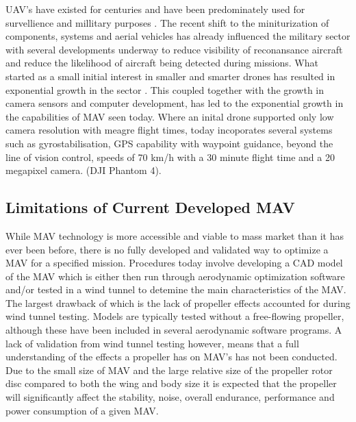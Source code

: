 UAV's have existed for centuries and have been predominately used for survellience and millitary purposes . The recent shift to the miniturization of components, systems and aerial vehicles has already influenced the military sector with several developments underway to reduce visibility of reconansance aircraft and reduce the likelihood of aircraft being detected during missions. What started as a small initial interest in smaller and smarter drones has resulted in exponential growth in the sector . This coupled together with the growth in camera sensors and computer development, has led to the exponential growth in the capabilities of MAV seen today. Where an inital drone supported only low camera resolution with meagre flight times, today incoporates several systems such as gyrostabilisation, GPS capability with waypoint guidance, beyond the line of vision control, speeds of 70 km/h with a 30 minute flight time and a 20 megapixel camera. (DJI Phantom 4). \\


\subsection{Limitations of Current Developed MAV}
\label{subsec:Limitations}
While MAV technology is more accessible and viable to mass market than it has ever been before, there is no fully developed and validated way to optimize a MAV for a specified mission. Procedures today involve developing a CAD model of the MAV which is either then run through aerodynamic optimization software and/or tested in a wind tunnel to detemine the main characteristics of the MAV. The largest drawback of which is the lack of propeller effects accounted for during wind tunnel testing. Models are typically tested without a free-flowing propeller, although these have been included in several aerodynamic software programs. A lack of validation from wind tunnel testing however, means that a full understanding of the effects a propeller has on MAV's has not been conducted. Due to the small size of MAV and the large relative size of the propeller rotor disc compared to both the wing and body size it is expected that the propeller will significantly affect the stability, noise, overall endurance, performance and power consumption of a given MAV. 

